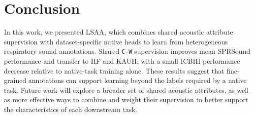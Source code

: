 \section{Conclusion}
\label{sec:conclusion}
\vspace{2mm}
In this work, we presented LSAA, which combines shared acoustic attribute supervision with dataset-specific native heads to learn from heterogeneous respiratory sound annotations. Shared \texttt{C-W} supervision improves mean SPRSound performance and transfer to HF and KAUH, with a small ICBHI performance decrease relative to native-task training alone. These results suggest that fine-grained annotations can support learning beyond the labels required by a native task. Future work will explore a broader set of shared acoustic attributes, as well as more effective ways to combine and weight their supervision to better support the characteristics of each downstream task.